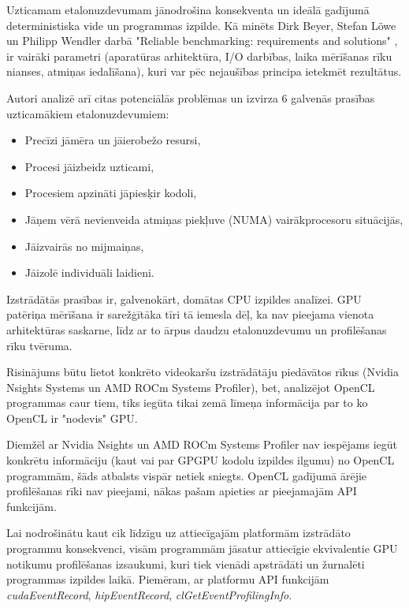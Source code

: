 Uzticamam etalonuzdevumam jānodrošina konsekventa un ideālā gadījumā
deterministiska vide un programmas izpilde. Kā minēts Dirk Beyer, Stefan Löwe
un Philipp Wendler darbā "Reliable benchmarking: requirements and solutions"
\cite{reliable-benchmarking}, ir vairāki parametri (aparatūras arhitektūra, I/O
darbības, laika mērīšanas rīku nianses, atmiņas iedalīšana), kuri var pēc
nejaušības principa ietekmēt rezultātus.

Autori analizē arī citas potenciālās problēmas un izvirza 6 galvenās prasības
uzticamākiem etalonuzdevumiem: \cite{reliable-benchmarking}
\begin{itemize}
    \item Precīzi jāmēra un jāierobežo resursi,
    \item Procesi jāizbeidz uzticami,
    \item Procesiem apzināti jāpiesķir kodoli,
    \item Jāņem vērā nevienveida atmiņas piekļuve (NUMA) vairākprocesoru
        situācijās,
    \item Jāizvairās no mijmaiņas,
    \item Jāizolē individuāli laidieni.
\end{itemize}

Izstrādātās prasības ir, galvenokārt, domātas CPU izpildes analīzei. GPU
patēriņa mērīšana ir sarežģītāka tīri tā iemesla dēļ, ka nav pieejama vienota
arhitektūras saskarne, līdz ar to ārpus daudzu etalonuzdevumu un profilēšanas
rīku tvēruma. \cite{reliable-benchmarking}

Risinājums būtu lietot konkrēto videokaršu izstrādātāju piedāvātos rīkus 
(Nvidia Nsights\cite{nvidia-nsights} Systems un AMD ROCm Systems
Profiler\cite{rocm-profiler}), bet, analizējot OpenCL programmas caur tiem,
tiks iegūta tikai zemā līmeņa informācija par to ko OpenCL ir "nodevis" GPU.

Diemžēl ar Nvidia Nsights un AMD ROCm Systems Profiler nav iespējams iegūt
konkrētu informāciju (kaut vai par GPGPU kodolu izpildes ilgumu) no OpenCL
programmām, šāds atbalsts vispār netiek
sniegts.\cite{rocm_sys_profiler_use_case} OpenCL gadījumā ārējie profilēšanas
rīki nav pieejami, nākas pašam apieties ar pieejamajām API funkcijām.

Lai nodrošinātu kaut cik līdzīgu uz attiecīgajām platformām izstrādāto
programmu konsekvenci, visām programmām jāsatur attiecīgie ekvivalentie GPU
notikumu profilēšanas izsaukumi, kuri tiek vienādi apstrādāti un žurnalēti
programmas izpildes laikā. Piemēram, ar platformu API funkcijām
\textit{cudaEventRecord}, \textit{hipEventRecord},
\textit{clGetEventProfilingInfo}.



